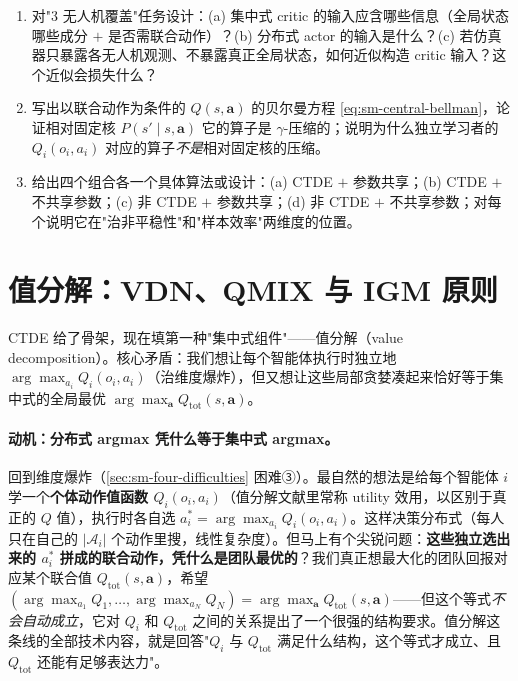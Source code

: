 \begin{practice}
\begin{enumerate}
  \item 对"3 无人机覆盖"任务设计：(a) 集中式 critic 的输入应含哪些信息（全局状态哪些成分 $+$ 是否需联合动作）？(b) 分布式 actor 的输入是什么？(c) 若仿真器只暴露各无人机观测、不暴露真正全局状态，如何近似构造 critic 输入？这个近似会损失什么？
  \item 写出以联合动作为条件的 $Q(s,\mathbf{a})$ 的贝尔曼方程 \cref{eq:sm-central-bellman}，论证相对固定核 $P(s'\mid s,\mathbf{a})$ 它的算子是 $\gamma$-压缩的；说明为什么独立学习者的 $Q_i(o_i,a_i)$ 对应的算子\emph{不是}相对固定核的压缩。
  \item 给出四个组合各一个具体算法或设计：(a) CTDE $+$ 参数共享；(b) CTDE $+$ 不共享参数；(c) 非 CTDE $+$ 参数共享；(d) 非 CTDE $+$ 不共享参数；对每个说明它在"治非平稳性"和"样本效率"两维度的位置。
\end{enumerate}
\end{practice}

\section{值分解：VDN、QMIX 与 IGM 原则}
\label{sec:sm-valuedecomp}

CTDE 给了骨架，现在填第一种"集中式组件"——值分解（value decomposition）。核心矛盾：我们想让每个智能体执行时独立地 $\arg\max_{a_i}Q_i(o_i,a_i)$（治维度爆炸），但又想让这些局部贪婪凑起来恰好等于集中式的全局最优 $\arg\max_{\mathbf{a}}Q_{\text{tot}}(s,\mathbf{a})$。

\paragraph{动机：分布式 argmax 凭什么等于集中式 argmax。}
回到维度爆炸（\cref{sec:sm-four-difficulties} 困难③）。最自然的想法是给每个智能体 $i$ 学一个\textbf{个体动作值函数 $Q_i(o_i,a_i)$}（值分解文献里常称 utility 效用，以区别于真正的 $Q$ 值），执行时各自选 $a_i^*=\arg\max_{a_i}Q_i(o_i,a_i)$。这样决策分布式（每人只在自己的 $|\mathcal{A}_i|$ 个动作里搜，线性复杂度）。但马上有个尖锐问题：\textbf{这些独立选出来的 $a_i^*$ 拼成的联合动作，凭什么是团队最优的}？我们真正想最大化的团队回报对应某个联合值 $Q_{\text{tot}}(s,\mathbf{a})$，希望 $(\arg\max_{a_1}Q_1,\dots,\arg\max_{a_N}Q_N)=\arg\max_{\mathbf{a}}Q_{\text{tot}}(s,\mathbf{a})$——但这个等式\emph{不会自动成立}，它对 $Q_i$ 和 $Q_{\text{tot}}$ 之间的关系提出了一个很强的结构要求。值分解这条线的全部技术内容，就是回答"$Q_i$ 与 $Q_{\text{tot}}$ 满足什么结构，这个等式才成立、且 $Q_{\text{tot}}$ 还能有足够表达力"。

